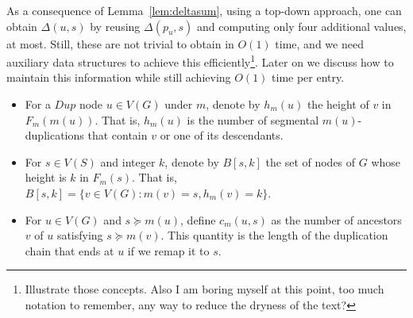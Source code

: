 \documentclass[10pt]{article}
\newcommand{\ml}[1]{\begingroup\color{blue}#1\endgroup}
\begin{document}
    As a consequence of Lemma~\ref{lem:deltasum}, using a top-down approach, one can obtain $\Delta(u, s)$ by reusing $\Delta(p_u, s)$ and computing only four additional values, at most.
    Still, these are not trivial to obtain in $O(1)$ time, and we need auxiliary data structures to achieve this efficiently\footnote{\ml{Illustrate those concepts.  Also I am boring myself at this point, too much notation to remember, any way to reduce the dryness of the text?}}.  Later on we discuss how to maintain this information while still achieving $O(1)$ time per entry.

\begin{itemize}
    
    \item 
    For a $Dup$ node $u \in V(G)$ under $m$, denote by $h_m(u)$ the height of $v$ in $F_m( m(u) )$.  
    That is, $h_m(u)$ is the number of segmental $m(u)$-duplications that contain $v$ or one of its descendants.

    
    \item 
    For $s \in V(S)$ and integer $k$, denote by $B[s, k]$ the set of nodes of $G$ whose height is $k$ in $F_m(s)$.  
    That is, $B[s, k] = \{v \in V(G) : m(v) = s, h_m(v) = k\}$. 

    \item 
    For $u \in V(G)$ and $s \succeq m(u)$, define $c_m(u, s)$ as the number of ancestors $v$ of $u$ satisfying $s \succeq m(v)$.
    This quantity is the length of the duplication chain that ends at $u$ if we remap it to $s$.  
    
    
 

\end{itemize}



    
\end{document}
